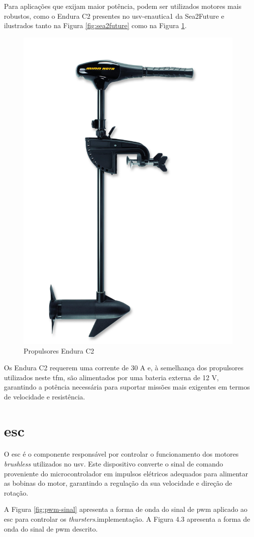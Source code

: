 Para aplicações que exijam maior potência, podem ser utilizados motores mais robustos, como o Endura C2 \cite{datasheet-endura-c2} presentes no \gls{usv}-enautica1 da Sea2Future \cite{sea2future} \cite{sea2future2} e ilustrados tanto na Figura \ref{fig:sea2future} como na Figura \ref{fig:endura-c2}.

\begin{figure}[H]
    \centering
    \includegraphics[width=0.33\linewidth]{figuras/endura-c2.jpg}
    \caption[Propulsores Endura C2]{Propulsores Endura C2 \cite{datasheet-endura-c2}}
    \label{fig:endura-c2}
\end{figure}

Os Endura C2 \cite{datasheet-endura-c2} requerem uma corrente de 30 A e, à semelhança dos propulsores utilizados neste \gls{tfm}, são alimentados por uma bateria externa de 12 V, garantindo a potência necessária para suportar missões mais exigentes em termos de velocidade e resistência.

\section{\acrfull{esc}}
\label{sec:esc}

O \acrfull{esc} é o componente responsável por controlar o funcionamento dos motores \emph{brushless} utilizados no \gls{usv}. Este dispositivo converte o sinal de comando proveniente do microcontrolador em impulsos elétricos adequados para alimentar as bobinas do motor, garantindo a regulação da sua velocidade e direção de rotação.

A Figura \ref{fig:pwm-sinal} apresenta a forma de onda do sinal de \gls{pwm} aplicado ao \gls{esc} para controlar os \emph{thursters}.implementação. A Figura 4.3 apresenta a forma de onda do sinal de \gls{pwm} descrito.

